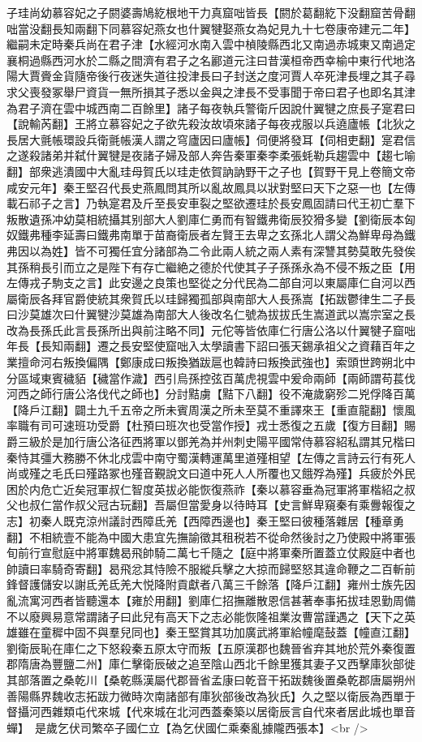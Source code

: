子珪尚幼慕容妃之子閼婆壽鳩紇根地干力真窟咄皆長【閼於葛翻紇下没翻窟苦骨翻咄當没翻長知兩翻下同慕容妃燕女也什翼犍娶燕女為妃見九十七卷康帝建元二年】繼嗣未定時秦兵尚在君子津【水經河水南入雲中楨陵縣西北又南過赤城東又南過定襄桐過縣西河水於二縣之間濟有君子之名酈道元注曰昔漢桓帝西幸榆中東行代地洛陽大賈賫金貨隨帝後行夜迷失道往投津長曰子封送之度河賈人卒死津長埋之其子尋求父喪發冢舉尸資貨一無所損其子悉以金與之津長不受事聞于帝曰君子也即名其津為君子濟在雲中城西南二百餘里】諸子每夜執兵警衛斤因說什翼犍之庶長子寔君曰【說輸芮翻】王將立慕容妃之子欲先殺汝故頃來諸子每夜戎服以兵遶廬帳【北狄之長居大氈帳環設兵衛氈帳漢人謂之穹廬因曰廬帳】伺便將發耳【伺相吏翻】寔君信之遂殺諸弟并弑什翼犍是夜諸子婦及部人奔告秦軍秦李柔張蚝勒兵趨雲中【趨七喻翻】部衆逃潰國中大亂珪母賀氏以珪走依賀訥訥野干之子也【賀野干見上卷簡文帝咸安元年】秦王堅召代長史燕鳳問其所以亂故鳳具以狀對堅曰天下之惡一也【左傳載石祁子之言】乃執寔君及斤至長安車裂之堅欲遷珪於長安鳳固請曰代王初亡羣下叛散遺孫冲幼莫相統攝其别部大人劉庫仁勇而有智鐵弗衛辰狡猾多變【劉衛辰本匈奴鐵弗種李延壽曰鐵弗南單于苗裔衛辰者左賢王去卑之玄孫北人謂父為鮮卑母為鐵弗因以為姓】皆不可獨任宜分諸部為二令此兩人統之兩人素有深讐其勢莫敢先發俟其孫稍長引而立之是陛下有存亡繼絶之德於代使其子子孫孫永為不侵不叛之臣【用左傳戎子駒支之言】此安邊之良策也堅從之分代民為二部自河以東屬庫仁自河以西屬衛辰各拜官爵使統其衆賀氏以珪歸獨孤部與南部大人長孫嵩【拓跋鬱律生二子長曰沙莫雄次曰什翼犍沙莫雄為南部大人後改名仁號為拔拔氏生嵩道武以嵩宗室之長改為長孫氏此言長孫所出與前注略不同】元佗等皆依庫仁行唐公洛以什翼犍子窟咄年長【長知兩翻】遷之長安堅使窟咄入太學讀書下詔曰張天錫承祖父之資藉百年之業擅命河右叛換偏隅【鄭康成曰叛換猶跋扈也韓詩曰叛換武強也】索頭世跨朔北中分區域東賓穢貊【穢當作濊】西引烏孫控弦百萬虎視雲中爰命兩師【兩師謂苟萇伐河西之師行唐公洛伐代之師也】分討黠虜【黠下八翻】役不淹歲窮殄二兇俘降百萬【降戶江翻】闢土九千五帝之所未賓周漢之所未至莫不重譯來王【重直龍翻】懷風率職有司可速班功受爵【杜預曰班次也受當作授】戎士悉復之五歲【復方目翻】賜爵三級於是加行唐公洛征西將軍以鄧羌為并州刺史陽平國常侍慕容紹私謂其兄楷曰秦恃其彊大務勝不休北戍雲中南守蜀漢轉運萬里道殣相望【左傳之言詩云行有死人尚或殣之毛氏曰殣路冢也殣音覲說文曰道中死人人所覆也又餓殍為殣】兵疲於外民困於内危亡近矣冠軍叔仁智度英拔必能恢復燕祚【秦以慕容垂為冠軍將軍楷紹之叔父也叔仁當作叔父冠古玩翻】吾屬但當愛身以待時耳【史言鮮卑窺秦有乘釁報復之志】初秦人既克涼州議討西障氐羌【西障西邊也】秦王堅曰彼種落雜居【種章勇翻】不相統壹不能為中國大患宜先撫諭徵其租税若不從命然後討之乃使殿中將軍張旬前行宣慰庭中將軍魏曷飛帥騎二萬七千隨之【庭中將軍秦所置蓋立仗殿庭中者也帥讀曰率騎奇寄翻】曷飛忿其恃險不服縱兵擊之大掠而歸堅怒其違命鞭之二百斬前鋒督護儲安以謝氐羌氐羌大悦降附貢獻者八萬三千餘落【降戶江翻】雍州士族先因亂流寓河西者皆聽還本【雍於用翻】劉庫仁招撫離散恩信甚著奉事拓拔珪恩勤周備不以廢興易意常謂諸子曰此兒有高天下之志必能恢隆祖業汝曹當謹遇之【天下之英雄雖在童穉中固不與羣兒同也】秦王堅賞其功加廣武將軍給幢麾鼔蓋【幢直江翻】劉衛辰恥在庫仁之下怒殺秦五原太守而叛【五原漢郡也魏晉省弃其地於荒外秦復置郡隋唐為豐鹽二州】庫仁擊衛辰破之追至陰山西北千餘里獲其妻子又西擊庫狄部徙其部落置之桑乾川【桑乾縣漢屬代郡晉省孟康曰乾音干拓跋魏後置桑乾郡唐屬朔州善陽縣界魏收志拓跋力微時次南諸部有庫狄部後改為狄氏】久之堅以衛辰為西單于督攝河西雜類屯代來城【代來城在北河西蓋秦築以居衛辰言自代來者居此城也單音蟬】　是歲乞伏司繁卒子國仁立【為乞伏國仁乘秦亂據隴西張本】<br />
